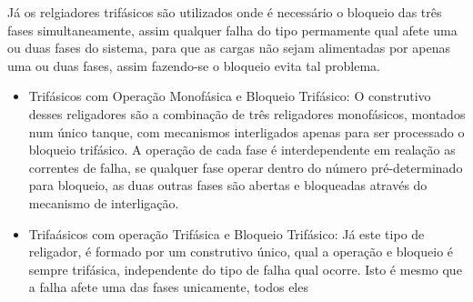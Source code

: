 \documentclass[oneside,openright,12pt]{ufsm_2021} %
\begin{document}
\par Já os relgiadores trifásicos são utilizados onde é necessário o bloqueio das três fases simultaneamente, assim qualquer falha do tipo permamente qual afete uma ou duas fases do sistema, para que as cargas não sejam alimentadas por apenas uma ou duas fases, assim fazendo-se o bloqueio evita tal problema. 
\begin{itemize}
	\item Trifásicos com Operação Monofásica e Bloqueio Trifásico: O construtivo desses religadores são a combinação de três religadores monofásicos, montados num único tanque, com mecanismos interligados apenas para ser processado o bloqueio trifásico. A operação de cada fase é interdependente em realação as correntes de falha, se qualquer fase operar dentro do número pré-determinado para bloqueio, as duas outras fases são abertas e bloqueadas através do mecanismo de interligação.
	\item Trifaásicos com operação Trifásica e Bloqueio Trifásico: Já este tipo de religador, é formado por um construtivo único, qual a operação e bloqueio é sempre trifásica, independente do tipo de falha qual ocorre. Isto é mesmo que a falha afete uma das fases unicamente, todos eles 
\end{itemize}








\startbibliography %

\end{document}
